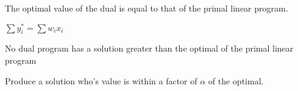 \begin{definition}
    The optimal value of the dual is equal to that of the primal linear program.

    $ \sum{y^{*}_{i}} = \sum{w_{i}x_{i}}$
\end{definition}

\begin{definition}
    No dual program has a solution greater than the optimal of the primal
    linear program
\end{definition}

\begin{definition}
    Produce a solution who's value is within a factor of $\alpha$ 
    of the optimal.
\end{definition}
